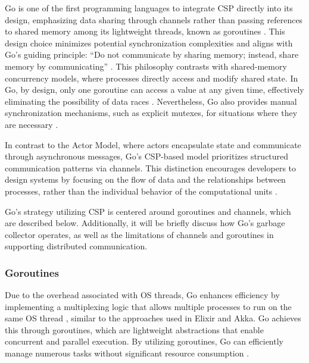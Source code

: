 Go is one of the first programming languages to integrate \gls{CSP} directly into its design, emphasizing data sharing through channels rather than passing references to shared memory among its lightweight threads, known as goroutines \cite{Cox-Buday2017}. This design choice minimizes potential synchronization complexities and aligns with Go’s guiding principle: “Do not communicate by sharing memory; instead, share memory by communicating” \cite{go-docs}. This philosophy contrasts with shared-memory concurrency models, where processes directly access and modify shared state. In Go, by design, only one goroutine can access a value at any given time, effectively eliminating the possibility of data races \cite{Kennedy2016,go-docs}. Nevertheless, Go also provides manual synchronization mechanisms, such as explicit mutexes, for situations where they are necessary \cite{Cox-Buday2017}.

In contrast to the Actor Model, where actors encapsulate state and communicate through asynchronous messages, Go’s \gls{CSP}-based model prioritizes structured communication patterns via channels. This distinction encourages developers to design systems by focusing on the flow of data and the relationships between processes, rather than the individual behavior of the computational units \cite{go-docs}.

Go's strategy utilizing \gls{CSP} is centered around goroutines and channels, which are described below. Additionally, it will be briefly discuss how Go's garbage collector operates, as well as the limitations of channels and goroutines in supporting distributed communication.

\subsubsection{Goroutines}

Due to the overhead associated with \gls{OS} threads, Go enhances efficiency by implementing a multiplexing logic that allows multiple processes to run on the same \gls{OS} thread \cite{Cox-Buday2017,Castro2019}, similar to the approaches used in Elixir and Akka. Go achieves this through goroutines, which are lightweight abstractions that enable concurrent and parallel execution. By utilizing goroutines, Go can efficiently manage numerous tasks without significant resource consumption \cite{go-docs}.


